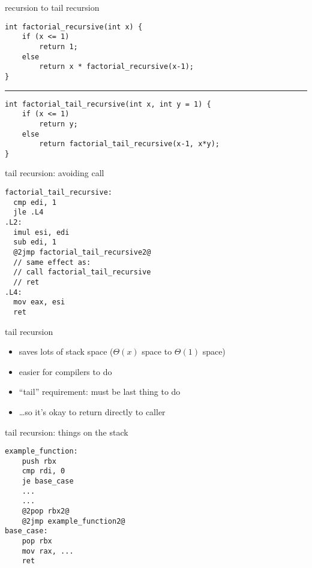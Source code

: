 \begin{frame}[fragile,label=recurseToTail]{recursion to tail recursion}
\lstset{language=C++,style=smaller}
\begin{lstlisting}
int factorial_recursive(int x) {
    if (x <= 1)
        return 1;
    else
        return x * factorial_recursive(x-1);
}
\end{lstlisting}
\hrule
\begin{lstlisting}
int factorial_tail_recursive(int x, int y = 1) {
    if (x <= 1)
        return y;
    else
        return factorial_tail_recursive(x-1, x*y);
}
\end{lstlisting}
\end{frame}

\begin{frame}[fragile,label=noCall]{tail recursion: avoiding call}
\begin{lstlisting}
factorial_tail_recursive:
  cmp edi, 1
  jle .L4
.L2:
  imul esi, edi
  sub edi, 1
  @2jmp factorial_tail_recursive2@
  // same effect as:
  // call factorial_tail_recursive
  // ret
.L4:
  mov eax, esi
  ret
\end{lstlisting}
\end{frame}

\begin{frame}{tail recursion}
\begin{itemize}
    \item saves lots of stack space ($\Theta(x)$ space to $\Theta(1)$ space)
    \item easier for compilers to do
    \vspace{.5cm}
    \item ``tail'' requirement: must be last thing to do
    \item \ldots so it's okay to return directly to caller
\end{itemize}
\end{frame}

\begin{frame}[fragile,label=tailRecOnStack]{tail recursion: things on the stack}
\begin{lstlisting}
example_function:
    push rbx
    cmp rdi, 0
    je base_case
    ...
    ...
    @2pop rbx2@
    @2jmp example_function2@
base_case:
    pop rbx
    mov rax, ...
    ret
\end{lstlisting}
\end{frame}

